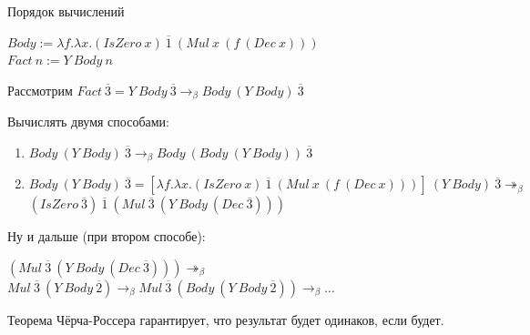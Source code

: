 \documentclass[aspectratio=169]{beamer}
\begin{document}
\begin{frame}{Порядок вычислений}

$Body := \lambda f.\lambda x.(IsZero\ x)\ \overline{1}\ (Mul\ x\ (f\ (Dec\ x)))$\\
$Fact\ n := Y\ Body\ n$

\begin{exm}
Рассмотрим $Fact\ \overline{3} = Y\ Body\ \overline{3} \rightarrow_\beta Body\ (Y\ Body)\ \overline{3}$
\end{exm}

Вычислять двумя способами:

\begin{enumerate}
\item $Body\ (Y\ Body)\ \overline{3} \rightarrow_\beta Body\ (Body\ (Y\ Body))\ \overline{3}$
\item $Body\ (Y\ Body)\ \overline{3} = \left[\lambda f.\lambda x.(IsZero\ x)\ \overline{1}\ (Mul\ x\ (f\ (Dec\ x)))\right]\ (Y\ Body)\ \overline{3} \twoheadrightarrow_\beta$
$(IsZero\ \overline{3})\ \overline{1}\ (Mul\ \overline{3}\ (Y\ Body\ (Dec\ \overline{3})))$
\end{enumerate}

Ну и дальше (при втором способе):

$(Mul\ \overline{3}\ (Y\ Body\ (Dec\ \overline{3}))) \twoheadrightarrow_\beta$
$Mul\ \overline{3}\ (Y\ Body\ \overline{2}) \rightarrow_\beta Mul\ \overline{3}\ (Body\ (Y\ Body\ \overline{2})) \rightarrow_\beta \dots$


\vspace{0.5cm}
Теорема Чёрча-Россера гарантирует, что результат будет одинаков, если будет.
\end{frame}
\end{document}
